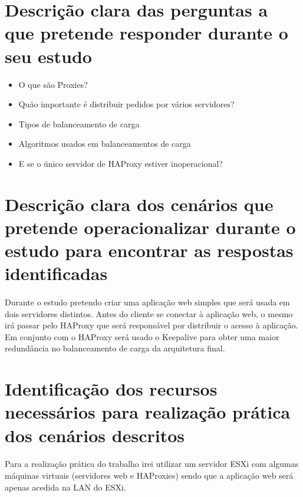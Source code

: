 \documentclass{article}
\begin{document}
\section{Descrição clara das perguntas a que pretende responder durante o seu estudo}
\begin{itemize}
  \item O que são Proxies?
  \item Quão importante é distribuir pedidos por vários servidores? 
  \item Tipos de balanceamento de carga
  \item Algoritmos usados em balanceamentos de carga
  \item E se o único servidor de HAProxy estiver inoperacional?
\end{itemize}

\section{Descrição clara dos cenários que pretende operacionalizar durante o estudo para encontrar as respostas identificadas}
\paragraph{}Durante o estudo pretendo criar uma aplicação web simples que será usada em dois servidores distintos. Antes do cliente se conectar à aplicação web, o mesmo irá passar pelo HAProxy que será responsável por distribuir o acesso à aplicação. \\
Em conjunto com o HAProxy será usado o Keepalive para obter uma maior redundância no balanceamento de carga da arquitetura final.


\section{Identificação dos recursos necessários para realização prática dos cenários descritos}
\paragraph{}
Para a realização prática do trabalho irei utilizar um servidor ESXi com algumas máquinas virtuais (servidores web e HAProxies) sendo que a aplicação web será apenas acedida na LAN do ESXi.
\end{document}
